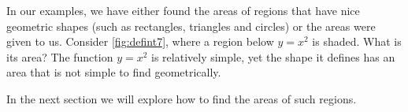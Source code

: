In our examples, we have either found the areas of regions that have nice geometric shapes (such as rectangles, triangles and circles) or the areas were given to us. Consider \autoref{fig:defint7}, where a region below $y=x^2$ is shaded. What is its area? The function $y=x^2$ is relatively simple, yet the shape it defines has an area that is not simple to find geometrically.\bigskip

\noindent In the next section we will explore how to find the areas of such regions.

